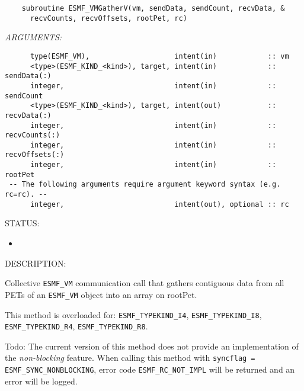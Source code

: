   
\begin{verbatim}    subroutine ESMF_VMGatherV(vm, sendData, sendCount, recvData, &
      recvCounts, recvOffsets, rootPet, rc)\end{verbatim}{\em ARGUMENTS:}
\begin{verbatim}      type(ESMF_VM),                    intent(in)            :: vm
      <type>(ESMF_KIND_<kind>), target, intent(in)            :: sendData(:)
      integer,                          intent(in)            :: sendCount
      <type>(ESMF_KIND_<kind>), target, intent(out)           :: recvData(:)
      integer,                          intent(in)            :: recvCounts(:)
      integer,                          intent(in)            :: recvOffsets(:)
      integer,                          intent(in)            :: rootPet
 -- The following arguments require argument keyword syntax (e.g. rc=rc). --
      integer,                          intent(out), optional :: rc\end{verbatim}
{\sf STATUS:}
   \begin{itemize}
   \item{}
   \end{itemize}
  
{\sf DESCRIPTION:\\ }


     Collective {\tt ESMF\_VM} communication call that gathers contiguous data 
     from all PETs of an {\tt ESMF\_VM} object into an array on rootPet.
  
     This method is overloaded for:
     {\tt ESMF\_TYPEKIND\_I4}, {\tt ESMF\_TYPEKIND\_I8},
     {\tt ESMF\_TYPEKIND\_R4}, {\tt ESMF\_TYPEKIND\_R8}.
  
     {\sc Todo:} The current version of this method does not provide an 
     implementation of the {\em non-blocking} feature. When calling this 
     method with {\tt syncflag = ESMF\_SYNC\_NONBLOCKING}, error code 
     {\tt ESMF\_RC\_NOT\_IMPL} will be returned and an error will be 
     logged.
  
